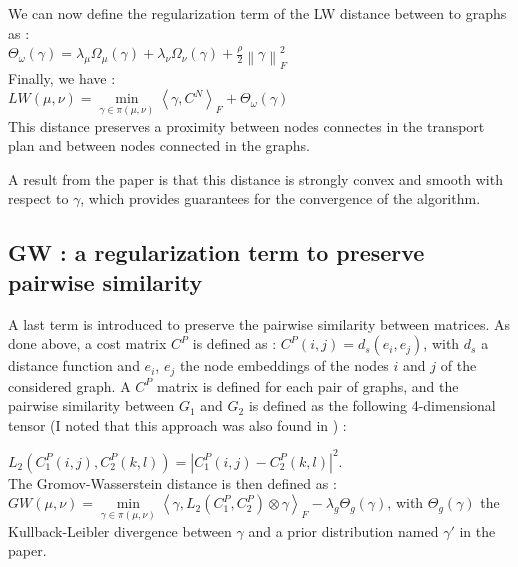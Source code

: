 \documentclass[a4paper,11pt]{article}
\begin{document}
We can now define the regularization term of the LW distance between to graphs as : \\
$\Theta_\omega(\gamma) = \lambda_\mu \Omega_\mu(\gamma) + \lambda_\nu \Omega_\nu(\gamma) + \frac{\rho}{2} \left\lVert \gamma \right\rVert _F^2 $\\

Finally, we have : \\

$LW(\mu, \nu) = \underset{\gamma \in \pi(\mu, \nu)}{\operatorname{min}} {\left\langle \gamma , C^N \right\rangle}_F + \Theta_\omega(\gamma)$\\


This distance preserves a proximity between nodes connectes in the transport plan and between nodes connected in the graphs.


A result from the paper is that this distance is strongly convex and smooth with respect to $\gamma$, which provides guarantees for the convergence of the algorithm.\\


\subsection{GW : a regularization term to preserve pairwise similarity}
\label{GW}
A last term is introduced to preserve the pairwise similarity between matrices. 
As done above, a cost matrix $C^P$ is defined as : $C^P(i,j) = d_s(e_i, e_j)$, with $d_s$ a distance function and $e_i$, $e_j$ the node embeddings of the nodes $i$ and $j$ of the considered graph. 
A $C^P$ matrix is defined for each pair of graphs, and the pairwise similarity between $G_1$ and $G_2$ is defined as the following 4-dimensional tensor (I noted that this approach was also found in \cite{titouan2019optimal}) : 

$L_2(C_1^P(i,j), C_2^P(k,l)) = \left\lvert C_1^P(i,j) - C_2^P(k,l) \right\rvert ^2 $. \\

The Gromov-Wasserstein distance is then defined as : \\

$GW(\mu, \nu) = \underset{\gamma \in \pi(\mu, \nu)}{\operatorname{min}} {\left\langle \gamma , L_2(C_1^P, C_2^P) \otimes \gamma \right\rangle}_F - \lambda_g \Theta_g(\gamma)$, with $\Theta_g(\gamma) $ the Kullback-Leibler divergence between $\gamma$ and a prior distribution named $\gamma '$ in the paper.
\end{document}
